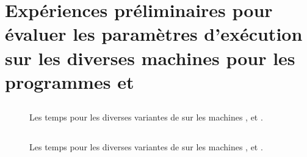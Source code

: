 
\chapter{Expériences préliminaires pour évaluer les paramètres
d'exécution sur les diverses machines pour les programmes
 et }

\section{}

\label{wordcount-java.ann}


\begin{figure}

\caption{Les temps pour les diverses variantes de  sur
les machines ,  et .}
\label{preliminaires-wordcount-java.fig}
\end{figure}



\newpage
\section{}

\label{stockprice-java.ann}


\begin{figure}

\caption{Les temps pour les diverses variantes de  sur
les machines ,  et .}
\label{preliminaires-stockprice-java.fig}
\end{figure}

